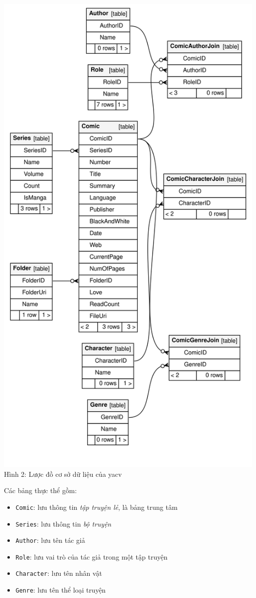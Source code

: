 \documentclass[
]{article}
\begin{document}
\includegraphics{../images/relationships.real.large.svg} Hình 2: Lược đồ
cơ sở dữ liệu của yacv

Các bảng thực thể gồm:

\begin{itemize}
\item
  \texttt{Comic}: lưu thông tin \emph{tập truyện lẻ}, là bảng trung tâm
\item
  \texttt{Series}: lưu thông tin \emph{bộ truyện}
\item
  \texttt{Author}: lưu tên tác giả
\item
  \texttt{Role}: lưu vai trò của tác giả trong một tập truyện
\item
  \texttt{Character}: lưu tên nhân vật
\item
  \texttt{Genre}: lưu tên thể loại truyện
\end{itemize}
\end{document}
